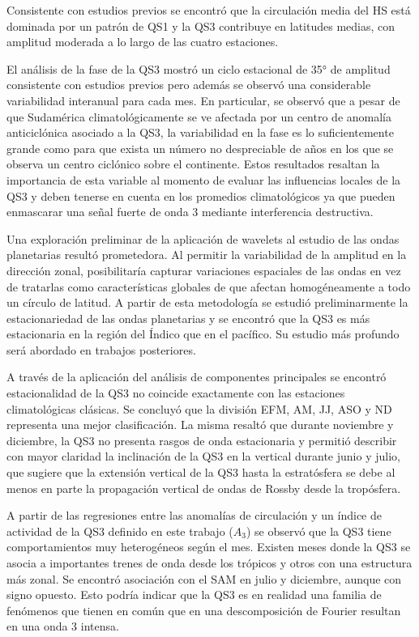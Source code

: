 \documentclass[spanish,a4paper,12pt,oneside]{book}
\begin{document}
Consistente con estudios previos se encontró que la circulación media
del HS está dominada por un patrón de QS1 y la QS3 contribuye en
latitudes medias, con amplitud moderada a lo largo de las cuatro
estaciones.

El análisis de la fase de la QS3 mostró un ciclo estacional de 35° de
amplitud consistente con estudios previos pero además se observó una
considerable variabilidad interanual para cada mes. En particular, se
observó que a pesar de que Sudamérica climatológicamente se ve afectada
por un centro de anomalía anticiclónica asociado a la QS3, la
variabilidad en la fase es lo suficientemente grande como para que
exista un número no despreciable de años en los que se observa un centro
ciclónico sobre el continente. Estos resultados resaltan la importancia
de esta variable al momento de evaluar las influencias locales de la QS3
y deben tenerse en cuenta en los promedios climatológicos ya que pueden
enmascarar una señal fuerte de onda 3 mediante interferencia
destructiva.

Una exploración preliminar de la aplicación de wavelets al estudio de
las ondas planetarias resultó prometedora. Al permitir la variabilidad
de la amplitud en la dirección zonal, posibilitaría capturar variaciones
espaciales de las ondas en vez de tratarlas como características
globales de que afectan homogéneamente a todo un círculo de latitud. A
partir de esta metodología se estudió preliminarmente la estacionariedad
de las ondas planetarias y se encontró que la QS3 es más estacionaria en
la región del Índico que en el pacífico. Su estudio más profundo será
abordado en trabajos posteriores.

A través de la aplicación del análisis de componentes principales se
encontró estacionalidad de la QS3 no coincide exactamente con las
estaciones climatológicas clásicas. Se concluyó que la división EFM, AM,
JJ, ASO y ND representa una mejor clasificación. La misma resaltó que
durante noviembre y diciembre, la QS3 no presenta rasgos de onda
estacionaria y permitió describir con mayor claridad la inclinación de
la QS3 en la vertical durante junio y julio, que sugiere que la
extensión vertical de la QS3 hasta la estratósfera se debe al menos en
parte la propagación vertical de ondas de Rossby desde la tropósfera.

A partir de las regresiones entre las anomalías de circulación y un
índice de actividad de la QS3 definido en este trabajo (\(A_3\)) se
observó que la QS3 tiene comportamientos muy heterogéneos según el mes.
Existen meses donde la QS3 se asocia a importantes trenes de onda desde
los trópicos y otros con una estructura más zonal. Se encontró
asociación con el SAM en julio y diciembre, aunque con signo opuesto.
Esto podría indicar que la QS3 es en realidad una familia de fenómenos
que tienen en común que en una descomposición de Fourier resultan en una
onda 3 intensa.
\end{document}
